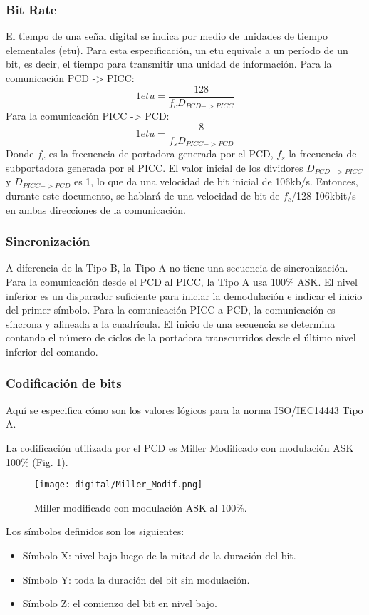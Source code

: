 \subsubsection{Bit Rate}
El tiempo de una señal digital se indica por medio de unidades de tiempo elementales (etu).
Para esta especificación, un etu equivale a un período de un bit, es decir, el tiempo para transmitir una unidad de información.\newline
Para la comunicación PCD -> PICC:
$$ 1 etu =  \frac{128}{f_c D_{PCD->PICC}}$$\newline
Para la comunicación PICC -> PCD:
$$ 1 etu =  \frac{8}{f_s D_{PICC->PCD}}$$
Donde $f_c$ es la frecuencia de portadora generada por el PCD, $f_s$ la frecuencia de subportadora generada por el PICC. El valor inicial de los dividores $D_{PCD->PICC}$ y $D_{PICC->PCD}$ es 1, lo que da una velocidad de bit inicial de 106kb/s.
Entonces, durante este documento, se hablará de una velocidad de bit de $f_c$/128 \~ 106kbit/s en ambas direcciones de la comunicación.


\subsubsection{Sincronización}
A diferencia de la Tipo B, la Tipo A no tiene una secuencia de sincronización. Para la comunicación desde el PCD al PICC, la Tipo A usa 100\% ASK. El nivel inferior es un disparador suficiente para iniciar la demodulación e indicar el inicio del primer símbolo.
Para la comunicación PICC a PCD, la comunicación es síncrona y alineada a la cuadrícula. El inicio de una secuencia se determina contando el número de ciclos de la portadora transcurridos desde el último nivel inferior del comando.

\subsubsection{Codificación de bits}
Aquí se especifica cómo son los valores lógicos para la norma ISO/IEC14443 Tipo A.

La codificación utilizada por el PCD es Miller Modificado con modulación ASK 100\% (Fig. \ref{fig:Mil}).

\begin{figure}[H]
\centering
\texttt{[image: digital/Miller\_Modif.png]}
\caption{Miller modificado con modulación ASK al 100\%.}
\label{fig:Mil}
\end{figure}

Los símbolos definidos son los siguientes:
\begin{itemize}
\item Símbolo X: nivel bajo luego de la mitad de la duración del bit.
\item Símbolo Y: toda la duración del bit sin modulación.
\item Símbolo Z: el comienzo del bit en nivel bajo.
\end{itemize}

